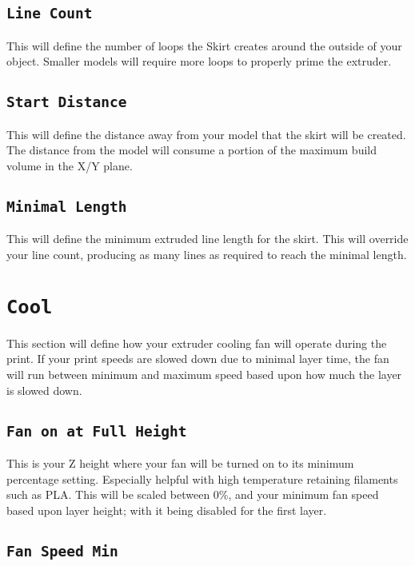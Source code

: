 \subsection{\texttt{Line Count}}
This will define the number of loops the Skirt creates around the outside of your object. Smaller models will require more loops to properly prime the extruder.

\subsection{\texttt{Start Distance}}
This will define the distance away from your model that the skirt will be created. The distance from the model will consume a portion of the maximum build volume in the X/Y plane.

\subsection{\texttt{Minimal Length}}
This will define the minimum extruded line length for the skirt. This will override your line count, producing as many lines as required to reach the minimal length.

\section{\texttt{Cool}} \label{sssec:Cooling}
This section will define how your extruder cooling fan will operate during the print. If your print speeds are slowed down due to minimal layer time, the fan will run between minimum and maximum speed based upon how much the layer is slowed down.

\subsection{\texttt{Fan on at Full Height}}
This is your Z height where your fan will be turned on to its minimum percentage setting. Especially helpful with high temperature retaining filaments such as PLA. This will be scaled between 0\%, and your minimum fan speed based upon layer height; with it being disabled for the first layer.

\subsection{\texttt{Fan Speed Min}}

